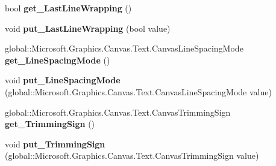 \begin{DoxyCompactItemize}
\item 
\mbox{\label{class_microsoft_1_1_graphics_1_1_canvas_1_1_text_1_1_canvas_text_format_aa855b7b2956b2494052e9cdd55b02fb4}} 
bool {\bfseries get\+\_\+\+Last\+Line\+Wrapping} ()
\item 
\mbox{\label{class_microsoft_1_1_graphics_1_1_canvas_1_1_text_1_1_canvas_text_format_a3a6a2fc656c46147b1092b31a50db0c1}} 
void {\bfseries put\+\_\+\+Last\+Line\+Wrapping} (bool value)
\item 
\mbox{\label{class_microsoft_1_1_graphics_1_1_canvas_1_1_text_1_1_canvas_text_format_a27e6bacad5baec82340ced77aff91b82}} 
global\+::\+Microsoft.\+Graphics.\+Canvas.\+Text.\+Canvas\+Line\+Spacing\+Mode {\bfseries get\+\_\+\+Line\+Spacing\+Mode} ()
\item 
\mbox{\label{class_microsoft_1_1_graphics_1_1_canvas_1_1_text_1_1_canvas_text_format_a886014158def86d2f1cff0ef5008817f}} 
void {\bfseries put\+\_\+\+Line\+Spacing\+Mode} (global\+::\+Microsoft.\+Graphics.\+Canvas.\+Text.\+Canvas\+Line\+Spacing\+Mode value)
\item 
\mbox{\label{class_microsoft_1_1_graphics_1_1_canvas_1_1_text_1_1_canvas_text_format_ad94de231bbaf0d4dc6bb416b81343159}} 
global\+::\+Microsoft.\+Graphics.\+Canvas.\+Text.\+Canvas\+Trimming\+Sign {\bfseries get\+\_\+\+Trimming\+Sign} ()
\item 
\mbox{\label{class_microsoft_1_1_graphics_1_1_canvas_1_1_text_1_1_canvas_text_format_a8066e8fae4c8e5707dfa8324ea7faf5b}} 
void {\bfseries put\+\_\+\+Trimming\+Sign} (global\+::\+Microsoft.\+Graphics.\+Canvas.\+Text.\+Canvas\+Trimming\+Sign value)
\item 
\mbox{\label{class_microsoft_1_1_graphics_1_1_canvas_1_1_text_1_1_canvas_text_format_a50e09efee298194e2e557308c2a13012}} 

\end{DoxyCompactItemize}
